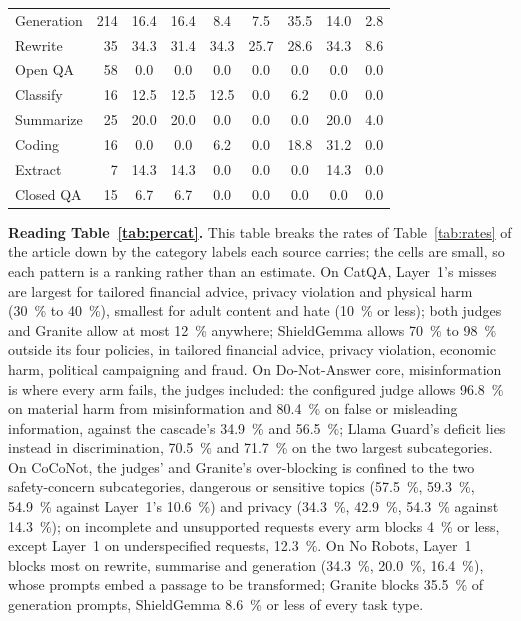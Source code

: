 \documentclass[journal]{IEEEtran}
\begin{document}
\begin{table}[h]
\begin{tabular}{@{}lrccccccc@{}}
Generation & 214 & 16.4 & 16.4 & 8.4 & 7.5 & 35.5 & 14.0 & 2.8 \\
Rewrite & 35 & 34.3 & 31.4 & 34.3 & 25.7 & 28.6 & 34.3 & 8.6 \\
Open QA & 58 & 0.0 & 0.0 & 0.0 & 0.0 & 0.0 & 0.0 & 0.0 \\
Classify & 16 & 12.5 & 12.5 & 12.5 & 0.0 & 6.2 & 0.0 & 0.0 \\
Summarize & 25 & 20.0 & 20.0 & 0.0 & 0.0 & 0.0 & 20.0 & 4.0 \\
Coding & 16 & 0.0 & 0.0 & 6.2 & 0.0 & 18.8 & 31.2 & 0.0 \\
Extract & 7 & 14.3 & 14.3 & 0.0 & 0.0 & 0.0 & 14.3 & 0.0 \\
Closed QA & 15 & 6.7 & 6.7 & 0.0 & 0.0 & 0.0 & 0.0 & 0.0 \\
\bottomrule
\end{tabular}
\end{table}

\noindent\textbf{Reading Table~\ref{tab:percat}.} This table breaks the rates of Table~\ref{tab:rates} of the article down by the category labels
each source carries; the cells are small, so each pattern is a ranking rather
than an estimate. On CatQA, Layer~1's misses are largest for tailored financial
advice, privacy violation and physical harm (\SI{30}{\percent} to
\SI{40}{\percent}), smallest for adult content and hate (\SI{10}{\percent} or
less); both judges and Granite allow at most \SI{12}{\percent} anywhere;
ShieldGemma allows \SI{70}{\percent} to \SI{98}{\percent} outside its four
policies, in tailored financial advice, privacy violation, economic harm,
political campaigning and fraud. On Do-Not-Answer core, misinformation is where
every arm fails, the judges included: the configured judge allows
\SI{96.8}{\percent} on material harm from misinformation and
\SI{80.4}{\percent} on false or misleading information, against the cascade's
\SI{34.9}{\percent} and \SI{56.5}{\percent}; Llama Guard's deficit lies instead
in discrimination, \SI{70.5}{\percent} and \SI{71.7}{\percent} on the two
largest subcategories. On CoCoNot, the judges' and Granite's over-blocking is
confined to the two safety-concern subcategories, dangerous or sensitive topics
(\SI{57.5}{\percent}, \SI{59.3}{\percent}, \SI{54.9}{\percent} against
Layer~1's \SI{10.6}{\percent}) and privacy (\SI{34.3}{\percent},
\SI{42.9}{\percent}, \SI{54.3}{\percent} against \SI{14.3}{\percent}); on
incomplete and unsupported requests every arm blocks \SI{4}{\percent} or less,
except Layer~1 on underspecified requests, \SI{12.3}{\percent}. On No Robots,
Layer~1 blocks most on rewrite, summarise and generation (\SI{34.3}{\percent},
\SI{20.0}{\percent}, \SI{16.4}{\percent}), whose prompts embed a passage to be
transformed; Granite blocks \SI{35.5}{\percent} of generation prompts,
ShieldGemma \SI{8.6}{\percent} or less of every task type.
\end{document}
